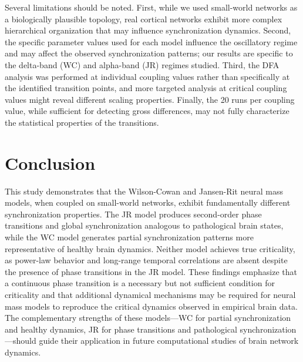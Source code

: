 \documentclass[12pt]{article}
\begin{document}
Several limitations should be noted. First, while we used small-world networks as a biologically plausible topology, real cortical networks exhibit more complex hierarchical organization that may influence synchronization dynamics. Second, the specific parameter values used for each model influence the oscillatory regime and may affect the observed synchronization patterns; our results are specific to the delta-band (WC) and alpha-band (JR) regimes studied. Third, the DFA analysis was performed at individual coupling values rather than specifically at the identified transition points, and more targeted analysis at critical coupling values might reveal different scaling properties. Finally, the 20 runs per coupling value, while sufficient for detecting gross differences, may not fully characterize the statistical properties of the transitions.

\section{Conclusion}

This study demonstrates that the Wilson-Cowan and Jansen-Rit neural mass models, when coupled on small-world networks, exhibit fundamentally different synchronization properties. The JR model produces second-order phase transitions and global synchronization analogous to pathological brain states, while the WC model generates partial synchronization patterns more representative of healthy brain dynamics. Neither model achieves true criticality, as power-law behavior and long-range temporal correlations are absent despite the presence of phase transitions in the JR model. These findings emphasize that a continuous phase transition is a necessary but not sufficient condition for criticality and that additional dynamical mechanisms may be required for neural mass models to reproduce the critical dynamics observed in empirical brain data. The complementary strengths of these models---WC for partial synchronization and healthy dynamics, JR for phase transitions and pathological synchronization---should guide their application in future computational studies of brain network dynamics.



\end{document}
